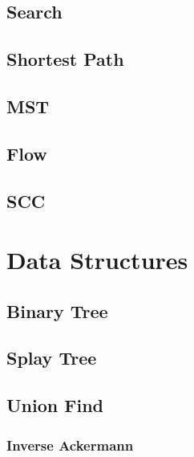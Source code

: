 \section{Search}


\section{Shortest Path}


\section{MST}


\section{Flow}


\section{SCC}


\chapter{Data Structures}

\section{Binary Tree}


\section{Splay Tree}


\section{Union Find}


\subsection{Inverse Ackermann}




